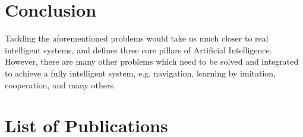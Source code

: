 \documentclass{article}
\begin{document}
\section{Conclusion}
\label{Sec:Con}

Tackling the aforementioned problems would take us much closer to
real intelligent systems, and defines three core pillars
of Artificial Intelligence. However, there are many other problems which
need to be solved and integrated to achieve a fully
intelligent system, e.g. navigation, learning by imitation, cooperation, and many others.





\section{List of Publications}
\label{Sec:Pub}
\end{document}
